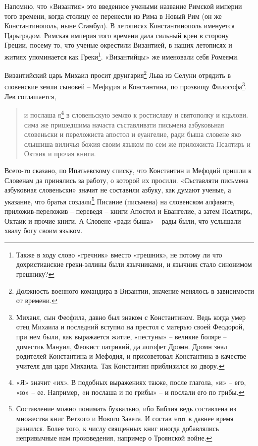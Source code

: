Напомню, что «Византия» это введенное учеными название Римской империи того времени, когда столицу ее перенесли из Рима в Новый Рим (он же Константинополь, ныне Стамбул). В летописях Константинополь именуется Царьградом. Римская империя того времени дала сильный крен в сторону Греции, посему то, что ученые окрестили Византией, в наших летописях и житиях упоминается как Греки\footnote{Также в ходу слово «гречник» вместо «грешник», не потому ли что дохристианские греки-эллины были язычниками, и язычник стало синонимом грешнику?}. «Византийцы» же именовали себя Ромеями. 

Византийский царь Михаил просит друнгария\footnote{Должность военного командира в Византии, значение менялось в зависимости от времени.} Льва из Селуни отрядить в словенские земли сыновей – Мефодия и Константина, по прозвищу Философа\footnote{Михаил, сын Феофила, давно был знаком с Константином. Ведь когда умер отец Михаила и последний вступил на престол с матерью своей Феодорой, при нем были, как выражается житие, «пестуны» – великие боляре – доместик Мануил, Феокист патрикий, да логофет Дромн. Дромн знал родителей Константина и Мефодия, и присоветовал Константина в качестве учителя для царя Михаила. Так Константин приблизился ко двору.}. Лев соглашается,

\begin{quotation}
и послаша я\footnote{«Я» значит «их». В подобных выражениях также, после глагола, «и» – его, «ю» – ее. Например, «и послаша и по грибы» – и послали его по грибы.} в словеньскую землю к ростиславу и святополку и кцьлови. сима же пришедшима начаста съставливати письмена азбуковьная словеньски и переложиста апостол и еуангелие, ради быша словене яко слышиша виличья божия своим языком по сем же приложиста Псалтирь и Октаик и прочая книги.
\end{quotation}

Всего-то сказано, по Ипатьевскому списку, что Константин и Мефодий пришли к Словенам да принялись за работу, о которой их просили.  «Съставляти письмена азбуковная словеньски» значит не составили азбуку, как думают ученые, а указание, что братья создали\footnote{Составление можно понимать буквально, ибо Библия ведь составлена из множества книг Ветхого и Нового Завета. И состав этот в давнее время разнился. Более того, к числу священных книг иногда добавлялись непривычные нам произведения, например о Троянской войне.} Писание (письмена) на словенском алфавите, приложив-переложив – переведя – книги Апостол и Евангелие, а затем Псалтирь, Октаик и прочие книги. А Словене «ради быша» – рады были, что услышали хвалу богу своим языком. 

